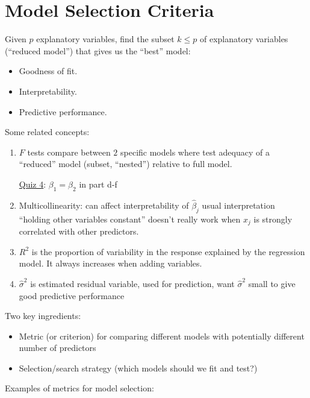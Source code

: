 \section{Model Selection Criteria}
Given $ p $ explanatory variables, find the subset
$ k\leqslant p $ of explanatory variables
(``reduced model'') that gives us
the ``best'' model:
\begin{itemize}
    \item Goodness of fit.
    \item Interpretability.
    \item Predictive performance.
\end{itemize}
Some related concepts:
\begin{enumerate}
    \item $ F $ tests compare between $ 2 $
          specific models where test adequacy of
          a ``reduced'' model (subset, ``nested'')
          relative to full model.

          \underline{Quiz 4}: $ \beta_1=\beta_2 $
          in part d-f
    \item Multicollinearity: can affect interpretability
          of $ \hat{\beta}_j $ usual interpretation
          ``holding other variables constant''
          doesn't really work when $ x_j $ is
          strongly correlated with other predictors.
    \item $ R^2 $ is the proportion
          of variability in the response explained by
          the regression model. It always increases
          when adding variables.
    \item $ \hat{\sigma}^2 $ is estimated residual variable,
          used for prediction, want $ \hat{\sigma}^2 $ small
          to give good predictive performance
\end{enumerate}
Two key ingredients:
\begin{itemize}
    \item Metric (or criterion) for comparing
          different models with potentially different number
          of predictors
    \item Selection/search strategy (which models
          should we fit and test?)
\end{itemize}
Examples of metrics for model selection:

